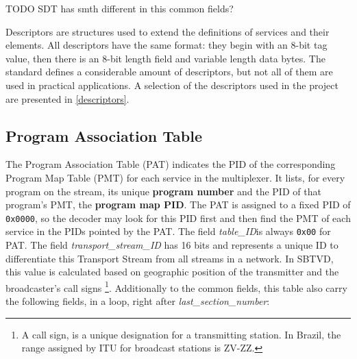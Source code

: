 \documentclass[
	12pt,				%
	openright,			%
	twoside,			%
	a4paper,			%
	brazil,
	french,				%
	english
	]{abntex2}
\begin{document}
TODO SDT has smth different in this common fields?

Descriptors are structures used to extend the definitions of services and their elements. All descriptors have the same format: they begin with an 8-bit tag value, then there is an 8-bit length field and variable length data bytes. The standard defines a considerable amount of descriptors, but not all of them are used in practical applications. A selection of the descriptors used in the project are presented in \autoref{descriptors}.


\subsection{Program Association Table}

The Program Association Table (PAT) indicates the PID of the corresponding Program Map Table (PMT) for each service in the multiplexer. It lists, for every program on the stream, its unique \textbf{program number} and the PID of that program's PMT, the \textbf{program map PID}. The PAT is assigned to a fixed PID of \texttt{0x0000}, so the decoder may look for this PID first and then find the PMT of each service in the PIDs pointed by the PAT. The field \textit{table\_ID}is always \texttt{0x00} for PAT. The field \textit{transport\_stream\_ID} has 16 bits and represents a unique ID to differentiate this Transport Stream from all streams in a network. In SBTVD, this value is calculated based on geographic position of the transmitter and the broadcaster's call signs \footnote{A call sign, is a unique designation for a transmitting station. In Brazil, the range assigned by ITU for broadcast stations is ZV-ZZ\cite{anatel}.}. Additionally to the common fields, this table also carry the following fields, in a loop, right after \textit{last\_section\_number}:
\end{document}

